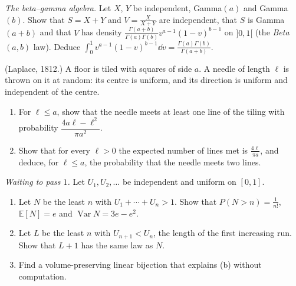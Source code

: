\begin{exercise}[$\star\star\star$]\label{ex:betagamma}
\emph{The beta--gamma algebra.} Let $X$, $Y$ be independent, Gamma$(a)$ and Gamma$(b)$. Show that $S=X+Y$ and $V=\frac X{X+Y}$ are independent,
that $S$ is Gamma$(a+b)$ and that $V$ has density $\frac{\Gamma(a+b)}{\Gamma(a)\Gamma(b)}v^{a-1}(1-v)^{b-1}$ on $]0,1[$ (the \emph{Beta}$(a,b)$ law). Deduce
$\int_0^1v^{a-1}(1-v)^{b-1}\dd v=\frac{\Gamma(a)\Gamma(b)}{\Gamma(a+b)}$.
\end{exercise}

\begin{exercise}[$\star\star$]\label{pb:laplace}
(Laplace, 1812.) A floor is tiled with squares of side $a$. A needle of length $\ell$ is thrown on it at random: its centre
is uniform, and its direction is uniform and independent of the centre.
\begin{enumerate}[label=(\alph*)]
\item For $\ell\le a$, show that the needle meets at least one line of the tiling with probability $\dfrac{4a\ell-\ell^2}{\pi a^2}$.
\item Show that for every $\ell>0$ the expected number of lines met is $\frac{4\ell}{\pi a}$, and deduce, for $\ell\le a$, the
probability that the needle meets two lines.
\end{enumerate}
\end{exercise}

\begin{exercise}[$\star$]\label{pb:passone}
\emph{Waiting to pass $1$.} Let $U_1,U_2,\dots$ be independent and uniform on $[0,1]$.
\begin{enumerate}[label=(\alph*)]
\item Let $N$ be the least $n$ with $U_1+\cdots+U_n>1$. Show that $P(N>n)=\frac1{n!}$, $\mathbb E[N]=e$ and $\operatorname{Var}N=3e-e^2$.
\item Let $L$ be the least $n$ with $U_{n+1}<U_n$, the length of the first increasing run. Show that $L+1$ has the same law as $N$.
\item Find a volume-preserving linear bijection that explains (b) without computation.
\end{enumerate}
\end{exercise}

